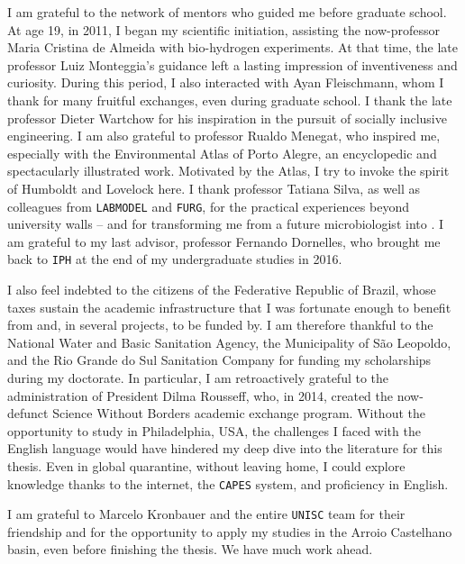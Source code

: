 \documentclass[./main_en.tex]{subfiles}
\begin{document}
\par I am grateful to the network of mentors who guided me before graduate school. At age 19, in 2011, I began my scientific initiation, assisting the now-professor Maria Cristina de Almeida with bio-hydrogen experiments. At that time, the late professor Luiz Monteggia's guidance left a lasting impression of inventiveness and curiosity. During this period, I also interacted with Ayan Fleischmann, whom I thank for many fruitful exchanges, even during graduate school. I thank the late professor Dieter Wartchow for his inspiration in the pursuit of socially inclusive engineering. I am also grateful to professor Rualdo Menegat, who inspired me, especially with the Environmental Atlas of Porto Alegre, an encyclopedic and spectacularly illustrated work. Motivated by the Atlas, I try to invoke the spirit of Humboldt and Lovelock here. I thank professor Tatiana Silva, as well as colleagues from \texttt{LABMODEL} and \texttt{FURG}, for the practical experiences beyond university walls -- and for transforming me from a future microbiologist into . I am grateful to my last advisor, professor Fernando Dornelles, who brought me back to \texttt{IPH} at the end of my undergraduate studies in 2016.

\par I also feel indebted to the citizens of the Federative Republic of Brazil, whose taxes sustain the academic infrastructure that I was fortunate enough to benefit from and, in several projects, to be funded by. I am therefore thankful to the National Water and Basic Sanitation Agency, the Municipality of São Leopoldo, and the Rio Grande do Sul Sanitation Company for funding my scholarships during my doctorate. In particular, I am retroactively grateful to the administration of President Dilma Rousseff, who, in 2014, created the now-defunct Science Without Borders academic exchange program. Without the opportunity to study in Philadelphia, USA, the challenges I faced with the English language would have hindered my deep dive into the literature for this thesis. Even in global quarantine, without leaving home, I could explore knowledge thanks to the internet, the \texttt{CAPES} system, and proficiency in English.

\par I am grateful to Marcelo Kronbauer and the entire \texttt{UNISC} team for their friendship and for the opportunity to apply my studies in the Arroio Castelhano basin, even before finishing the thesis. We have much work ahead.
\end{document}
